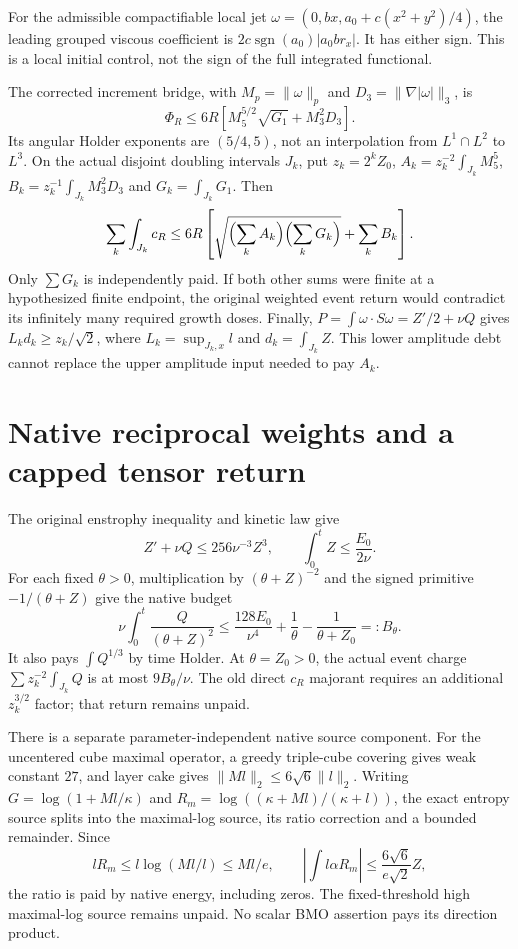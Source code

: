 \documentclass[11pt]{article}
\begin{document}
For the admissible compactifiable local jet
$\omega=(0,bx,a_0+c(x^2+y^2)/4)$, the leading grouped viscous coefficient is
$2c\operatorname{sgn}(a_0)|a_0br_x|$. It has either sign. This is a local
initial control, not the sign of the full integrated functional.

The corrected increment bridge, with $M_p=\|\omega\|_p$ and
$D_3=\|\nabla|\omega|\|_3$, is
\[
 \Phi_R\le6R\left[M_5^{5/2}\sqrt{G_1}+M_3^2D_3\right].
\]
Its angular Holder exponents are $(5/4,5)$, not an interpolation from
$L^1\cap L^2$ to $L^3$. On the actual disjoint doubling intervals $J_k$,
put $z_k=2^kZ_0$, $A_k=z_k^{-2}\int_{J_k}M_5^5$,
$B_k=z_k^{-1}\int_{J_k}M_3^2D_3$ and $G_k=\int_{J_k}G_1$. Then
\[
 \sum_k\int_{J_k}c_R\le6R
 \left[\sqrt{\Bigl(\sum_k A_k\Bigr)\Bigl(\sum_kG_k\Bigr)}
                         +\sum_kB_k\right].
\]
Only $\sum G_k$ is independently paid. If both other sums were finite at
a hypothesized finite endpoint, the original weighted event return would
contradict its infinitely many required growth doses. Finally,
$P=\int\omega\cdot S\omega=Z'/2+\nu Q$ gives
$L_kd_k\ge z_k/\sqrt2$, where $L_k=\sup_{J_k,x}l$ and
$d_k=\int_{J_k}Z$. This lower amplitude debt cannot replace the upper
amplitude input needed to pay $A_k$.

\section{Native reciprocal weights and a capped tensor return}
The original enstrophy inequality and kinetic law give
\[
 Z'+\nu Q\le256\nu^{-3}Z^3,\qquad
 \int_0^tZ\le\frac{E_0}{2\nu}.
\]
For each fixed $\theta>0$, multiplication by $(\theta+Z)^{-2}$ and
the signed primitive $-1/(\theta+Z)$ give the native budget
\[
 \nu\int_0^t\frac{Q}{(\theta+Z)^2}
 \le\frac{128E_0}{\nu^4}+\frac1\theta-\frac1{\theta+Z_0}=:B_\theta.
\]
It also pays $\int Q^{1/3}$ by time Holder. At $\theta=Z_0>0$, the actual
event charge $\sum z_k^{-2}\int_{J_k}Q$ is at most $9B_\theta/\nu$.
The old direct $c_R$ majorant requires an additional $z_k^{3/2}$ factor;
that return remains unpaid.

There is a separate parameter-independent native source component. For the
uncentered cube maximal operator, a greedy triple-cube covering gives weak
constant $27$, and layer cake gives $\|Ml\|_2\le6\sqrt6\|l\|_2$.
Writing $G=\log(1+Ml/\kappa)$ and
$R_m=\log((\kappa+Ml)/(\kappa+l))$, the exact entropy source splits into
the maximal-log source, its ratio correction and a bounded remainder. Since
\[
 lR_m\le l\log(Ml/l)\le Ml/e,
 \qquad \left|\int l\alpha R_m\right|
                    \le\frac{6\sqrt6}{e\sqrt2}Z,
\]
the ratio is paid by native energy, including zeros. The fixed-threshold
high maximal-log source remains unpaid. No scalar BMO assertion pays its
direction product.
\end{document}
